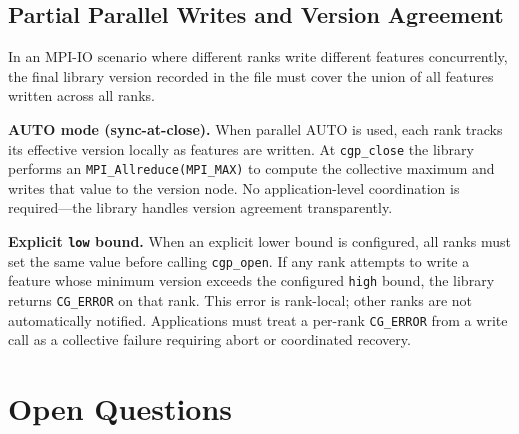 \documentclass[11pt,letterpaper]{article}
\begin{document}
\subsection{Partial Parallel Writes and Version Agreement}

In an MPI-IO scenario where different ranks write different features
concurrently, the final library version recorded in the file must cover the union of all
features written across all ranks.

\textbf{AUTO mode (sync-at-close).}  When parallel AUTO is used,
each rank tracks its effective version locally as features are
written.  At \texttt{cgp\_close} the library performs an
\texttt{MPI\_Allreduce(MPI\_MAX)} to compute the collective maximum
and writes that value to the version node.  No application-level
coordination is required---the library handles version agreement
transparently.

\textbf{Explicit \texttt{low} bound.}  When an explicit lower bound
is configured, all ranks must set the same value before calling
\texttt{cgp\_open}.  If any rank attempts to write a feature whose
minimum version exceeds the configured \texttt{high} bound, the
library returns \texttt{CG\_ERROR} on that rank.  This error is
rank-local; other ranks are not automatically notified.  Applications
must treat a per-rank \texttt{CG\_ERROR} from a write call as a
collective failure requiring abort or coordinated recovery.

\section{Open Questions}
\end{document}
